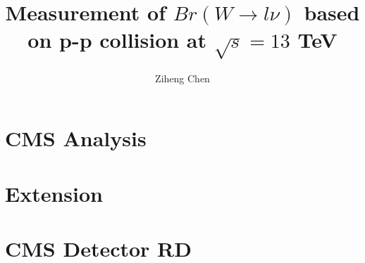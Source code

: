 \documentclass[12pt]{nuthesis}
\author{Ziheng Chen}
\title{Measurement of $Br(W\to l \nu)$ based on p-p collision at $\sqrt{s}=13$ TeV}
\begin{document}
    

    
    \mainmatter  
    
    \part{CMS Analysis}
    
    
    
    
    
    
    
    


    \part{Extension}
    
    


    \part{CMS Detector RD}
    
    


    
    

    \begin{singlespace}
    
    
    \end{singlespace}

    \appendix
    
    
    
    
    
    


    
\end{document}

